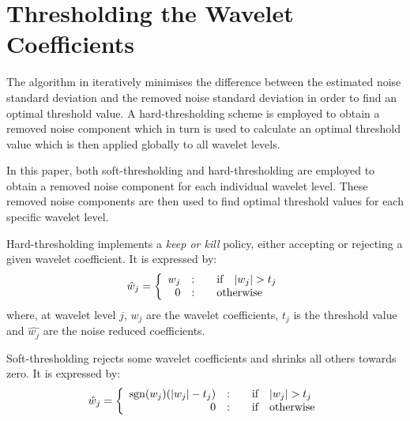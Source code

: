 \documentclass[twocolumn]{article}
\begin{document}
\section{Thresholding the Wavelet Coefficients}
The algorithm in \cite{yu96} iteratively minimises the difference between the estimated noise standard
deviation and the removed noise standard deviation in order to find an optimal threshold value.
A hard-thresholding scheme is employed to obtain a removed noise component which in turn is used to calculate 
an optimal threshold value which is then applied globally to all wavelet levels. 

In this paper, both soft-thresholding and hard-thresholding are employed to obtain a removed noise component
for each individual wavelet level. These removed noise components are then used to find optimal threshold values for 
each specific wavelet level.

Hard-thresholding implements a \emph{keep or kill} policy, either accepting or rejecting a given wavelet coefficient.
It is expressed by:
\begin{equation}
        \hat{w}_{j} = \left\{ \begin{array}{r@{\quad:\quad}l} w_{j} & \quad\mbox{if}\quad |w_{j}| > t_{j} \\
        0 & \quad\mbox{otherwise}\quad \end{array} \right.
        \label{eq:wHat}
\end{equation}
where, at wavelet level $j$, $w_{j}$ are the wavelet coefficients, $t_{j}$ is the threshold value and
$\hat{w_{j}}$ are the noise reduced coefficients.

Soft-thresholding rejects some wavelet coefficients and shrinks all others towards zero. It is expressed by:
\begin{equation}
        \hat{w}_{j} = \left\{ \begin{array}{r@{\quad:\quad}l} 
	{\rm sgn}(w_{j})(|w_{j}|-t_{j}) & \quad\mbox{if}\quad |w_{j}| > t_{j} \\
        0 & \quad\mbox{if}\quad\mbox{otherwise} \\ 
	\end{array} \right.
        \label{eq:softWHat}
\end{equation}
\end{document}
